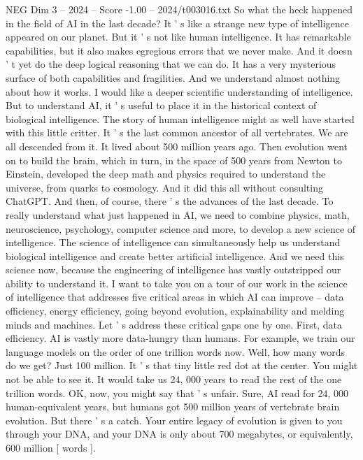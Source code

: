 \begin{textsample}{NEG Dim 3 – 2024 – Score -1.00 – 2024/t003016.txt}  \label{ex:f3_neg_059}
So what the heck happened in the field of AI in the last decade?
It ' s like a strange new type of intelligence appeared on our planet.
But it ' s not like human intelligence.
It has remarkable capabilities, but it also makes egregious errors that we never make.
And it doesn ' t yet do the deep logical reasoning that we can do.
It has a very mysterious surface of both capabilities and fragilities.
And we understand almost nothing about how it works.
I would like a deeper scientific understanding of intelligence.
But to understand AI, it ' s useful to place it in the historical context of biological intelligence.
The story of human intelligence might as well have started with this little critter.
It ' s the last common ancestor of all vertebrates.
We are all descended from it.
It lived about 500 million years ago.
Then evolution went on to build the brain, which in turn, in the space of 500 years from Newton to Einstein, developed the deep math and physics required to understand the universe, from quarks to cosmology.
And it did this all without consulting ChatGPT.
And then, of course, there ' s the advances of the last decade.
To really understand what just happened in AI, we need to combine physics, math, neuroscience, psychology, computer science and more, to develop a new science of intelligence.
The science of intelligence can simultaneously help us understand biological intelligence and create better artificial intelligence.
And we need this science now, because the engineering of intelligence has vastly outstripped our ability to understand it.
I want to take you on a tour of our work in the science of intelligence that addresses five critical areas in which AI can improve -- data efficiency, energy efficiency, going beyond evolution, explainability and melding minds and machines.
Let ' s address these critical gaps one by one.
First, data efficiency.
AI is vastly more data-hungry than humans.
For example, we train our language models on the order of one trillion words now.
Well, how many words do we get?
Just 100 million.
It ' s that tiny little red dot at the center.
You might not be able to see it.
It would take us 24, 000 years to read the rest of the one trillion words.
OK, now, you might say that ' s unfair.
Sure, AI read for 24, 000 human-equivalent years, but humans got 500 million years of vertebrate brain evolution.
But there ' s a catch.
Your entire legacy of evolution is given to you through your DNA, and your DNA is only about 700 megabytes, or equivalently, 600 million [ words ].

\end{textsample}
